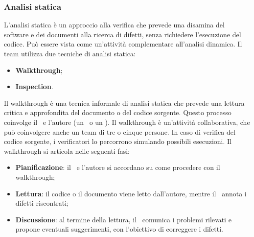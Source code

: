 \subsubsection{Analisi statica}
\par L’analisi statica è un approccio alla verifica che prevede una disamina del software e dei documenti alla ricerca di difetti, senza richiedere l’esecuzione del codice. Può essere vista come un’attività complementare all’analisi dinamica. Il team utilizza due tecniche di analisi statica:
\begin{itemize}
  \item \textbf{Walkthrough};
  \item \textbf{Inspection}.
\end{itemize}

\par Il walkthrough è una tecnica informale di analisi statica che prevede una lettura critica e approfondita del documento o del codice sorgente. Questo processo coinvolge il \Verificatore\ e l’autore (un \Programmatore\ o un \Redattore). Il walkthrough è un'attività collaborativa, che può coinvolgere anche un team di tre o cinque persone. In caso di verifica del codice sorgente, i verificatori lo percorrono simulando possibili esecuzioni. Il walkthrough si articola nelle seguenti fasi:
\begin{itemize}
  \item \textbf{Pianificazione}: il \Verificatore\ e l'autore si accordano su come procedere con il walkthrough;
  \item \textbf{Lettura}: il codice o il documento viene letto dall'autore, mentre il \Verificatore\ annota i difetti riscontrati;
  \item \textbf{Discussione}: al termine della lettura, il \Verificatore\ comunica i problemi rilevati e propone eventuali suggerimenti, con l'obiettivo di correggere i difetti.
\end{itemize}

